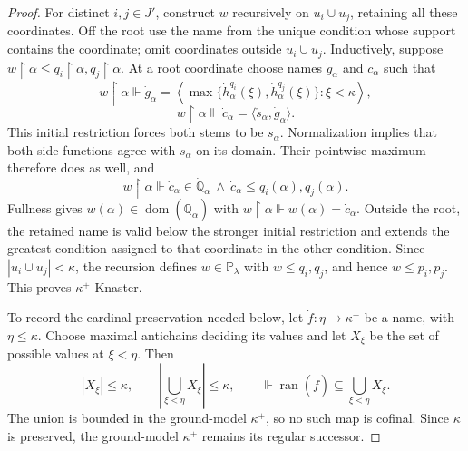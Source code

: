 \documentclass[11pt,a4paper]{amsart}
\theoremstyle{definition}
\theoremstyle{remark}
\newcommand{\PP}{\mathbb P}
\DeclareMathOperator{\dom}{dom}
\begin{document}
\begin{proof}
For distinct \(i,j\in J'\), construct \(w\) recursively
on \(u_i\cup u_j\), retaining all these coordinates.
Off the root use the name from the unique condition whose
support contains the coordinate; omit coordinates outside
\(u_i\cup u_j\). Inductively, suppose
\(w\restriction\alpha\leq
q_i\restriction\alpha,q_j\restriction\alpha\).
At a root coordinate choose names \(\dot g_\alpha\) and
\(\dot c_\alpha\) such that
\[
 w\restriction\alpha\Vdash
 \dot g_\alpha=\left\langle
       \max\{\dot h_\alpha^{q_i}(\xi),\dot h_\alpha^{q_j}(\xi)\}:
                                      \xi<\kappa\right\rangle,
\]
\[
 w\restriction\alpha\Vdash
 \dot c_\alpha=\langle\check s_\alpha,\dot g_\alpha\rangle.
\]
This initial restriction forces both stems to be \(s_\alpha\).
Normalization implies that both side functions agree with
\(s_\alpha\) on its domain. Their pointwise maximum therefore
does as well, and
\[
 w\restriction\alpha\Vdash
 \dot c_\alpha\in\dot{\mathbb Q}_\alpha
              \ \land\ \dot c_\alpha\leq q_i(\alpha),q_j(\alpha).
\]
Fullness gives \(w(\alpha)\in\dom(\dot{\mathbb Q}_\alpha)\)
with \(w\restriction\alpha\Vdash
w(\alpha)=\dot c_\alpha\). Outside the root, the retained name
is valid below the stronger initial restriction and extends the
greatest condition assigned to that coordinate in the other
condition. Since
\(|u_i\cup u_j|<\kappa\), the recursion defines
\(w\in\PP_\lambda\) with \(w\leq q_i,q_j\),
and hence \(w\leq p_i,p_j\). This proves
\(\kappa^+\)-Knaster.

To record the cardinal preservation needed below, let
\(\dot f:\eta\to\kappa^+\) be a name, with \(\eta\leq\kappa\).
Choose maximal antichains deciding its values and let
\(X_\xi\) be the set of possible values at \(\xi<\eta\).
Then
\[
 |X_\xi|\leq\kappa,\qquad
 \left|\bigcup_{\xi<\eta}X_\xi\right|\leq\kappa,
 \qquad
 \Vdash\operatorname{ran}(\dot f)
                           \subseteq\bigcup_{\xi<\eta}X_\xi.
\]
The union is bounded in the ground-model \(\kappa^+\), so
no such map is cofinal. Since \(\kappa\) is preserved, the
ground-model \(\kappa^+\) remains its regular successor.
\end{proof}
\end{document}
